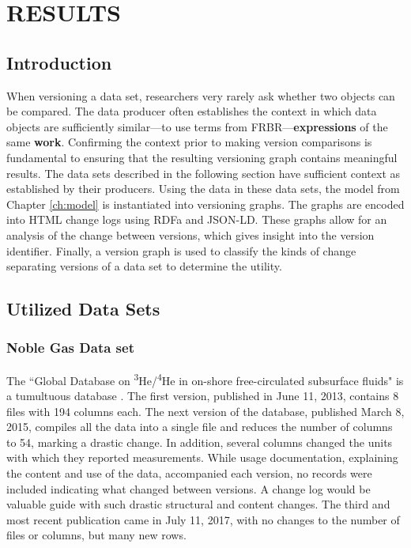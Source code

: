 
\chapter{RESULTS}\label{ch:implement}

\section{Introduction}

When versioning a data set, researchers very rarely ask whether two objects can be compared.
The data producer often establishes the context in which data objects are sufficiently similar---to use terms from FRBR---\textbf{expressions} of the same \textbf{work}.
Confirming the context prior to making version comparisons is fundamental to ensuring that the resulting versioning graph contains meaningful results.
The data sets described in the following section have sufficient context as established by their producers.
Using the data in these data sets, the model from Chapter \ref{ch:model} is instantiated into versioning graphs.
The graphs are encoded into HTML change logs using RDFa and JSON-LD.
These graphs allow for an analysis of the change between versions, which gives insight into the version identifier.
Finally, a version graph is used to classify the kinds of change separating versions of a data set to determine the utility.

\section{Utilized Data Sets}

\subsection{Noble Gas Data set}

The ``Global Database on \textsuperscript{3}He/\textsuperscript{4}He in on-shore free-circulated subsurface fluids" is a tumultuous database \cite{Polyak2015}.
The first version, published in June 11, 2013, contains 8 files with 194 columns each.
The next version of the database, published March 8, 2015, compiles all the data into a single file and reduces the number of columns to 54, marking a drastic change.
In addition, several columns changed the units with which they reported measurements.
While usage documentation, explaining the content and use of the data, accompanied each version, no records were included indicating what changed between versions.
A change log would be valuable guide with such drastic structural and content changes.
The third and most recent publication came in July 11, 2017, with no changes to the number of files or columns, but many new rows.

